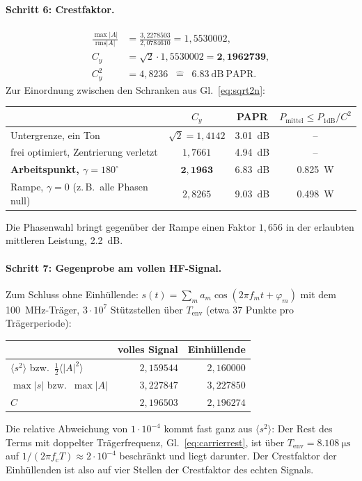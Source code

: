 \documentclass[11pt,a4paper]{article}
\newcommand{\crest}{\ensuremath{C}}
\begin{document}
\paragraph{Schritt 6: Crestfaktor.}
\begin{align}
  \frac{\max|A|}{\mathrm{rms}|A|} &= \frac{3{,}2278503}{2{,}0784610} = 1{,}5530002 ,\\
  \crest_y &= \sqrt2\cdot1{,}5530002 = \mathbf{2{,}1962739} ,\\
  \crest_y^2 &= 4{,}8236 \;\;\hat{=}\;\; \SI{6.83}{\deci\bel}\ \text{PAPR}.
\end{align}
Zur Einordnung zwischen den Schranken aus Gl.~\eqref{eq:sqrt2n}:
\begin{center}
\begin{tabular}{@{}lccc@{}}
  \toprule
  & $\crest_y$ & PAPR & $P_\mathrm{mittel}\le P_{1\mathrm{dB}}/\crest^2$\\
  \midrule
  Untergrenze, ein Ton & $\sqrt2 = 1{,}4142$ & \SI{3.01}{\deci\bel} & --\\
  frei optimiert, Zentrierung verletzt & $1{,}7661$ & \SI{4.94}{\deci\bel} & --\\
  \textbf{Arbeitspunkt, $\gamma=180^\circ$} & $\mathbf{2{,}1963}$ & \SI{6.83}{\deci\bel} & \SI{0.825}{\watt}\\
  Rampe, $\gamma=0$ (z.\,B.\ alle Phasen null) & $2{,}8265$ & \SI{9.03}{\deci\bel} & \SI{0.498}{\watt}\\
  \bottomrule
\end{tabular}
\end{center}
Die Phasenwahl bringt gegenüber der Rampe einen Faktor $1{,}656$ in der
erlaubten mittleren Leistung, \SI{2.2}{\deci\bel}.

\paragraph{Schritt 7: Gegenprobe am vollen HF-Signal.}
Zum Schluss ohne Einhüllende: $s(t) = \sum_m a_m\cos(2\pi f_m t + \varphi_m)$
mit dem \SI{100}{\mega\hertz}-Träger, $3\cdot10^7$ Stützstellen über
$T_\mathrm{env}$ (etwa 37 Punkte pro Trägerperiode):
\begin{center}
\begin{tabular}{@{}lrr@{}}
  \toprule
  & volles Signal & Einhüllende\\
  \midrule
  $\langle s^2\rangle$ bzw.\ $\tfrac12\langle|A|^2\rangle$ & $2{,}159544$ & $2{,}160000$\\
  $\max|s|$ bzw.\ $\max|A|$ & $3{,}227847$ & $3{,}227850$\\
  $\crest$ & $2{,}196503$ & $2{,}196274$\\
  \bottomrule
\end{tabular}
\end{center}
Die relative Abweichung von $1\cdot10^{-4}$ kommt fast ganz aus
$\langle s^2\rangle$: Der Rest des Terms mit doppelter Trägerfrequenz,
Gl.~\eqref{eq:carrierrest}, ist über $T_\mathrm{env}=\SI{8.108}{\micro\second}$
auf $1/(2\pi f_\mathrm{c}T) \approx 2\cdot10^{-4}$ beschränkt und liegt darunter.
Der Crestfaktor der Einhüllenden ist also auf vier Stellen der
Crestfaktor des echten Signals.
\end{document}
